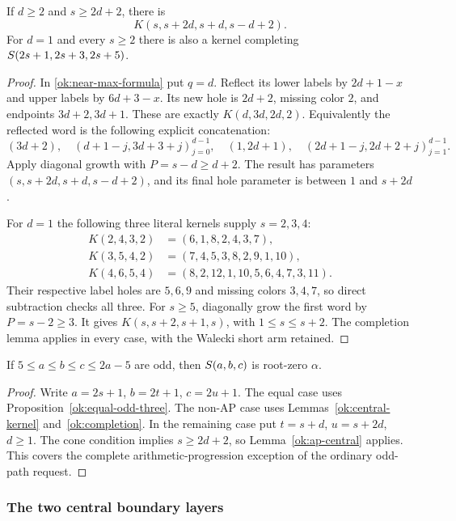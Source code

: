 \begin{lemma}\label{ok:ap-central}
If $d\ge2$ and $s\ge2d+2$, there is
\[
 K(s,s+2d,s+d,s-d+2).
 \]
For $d=1$ and every $s\ge2$ there is also a kernel completing
$S\!\left(2s+1,2s+3,2s+5\right)$.
\end{lemma}
\begin{proof}
In \eqref{ok:near-max-formula} put $q=d$. Reflect its lower
labels by $2d+1-x$ and upper labels by $6d+3-x$. Its new hole
is $2d+2$, missing color $2$, and endpoints $3d+2,3d+1$.
These are exactly $K(d,3d,2d,2)$. Equivalently the reflected word
is the following explicit concatenation:
\[
 (3d+2),\quad
 (d+1-j,3d+3+j)_{j=0}^{d-1},\quad
 (1,2d+1),\quad
 (2d+1-j,2d+2+j)_{j=1}^{d-1}.
 \]
Apply diagonal growth with $P=s-d\ge d+2$. The result has
parameters $(s,s+2d,s+d,s-d+2)$, and its final hole parameter
is between $1$ and $s+2d$.

For $d=1$ the following three literal kernels supply $s=2,3,4$:
\begin{align*}
 K(2,4,3,2)&=(6,1,8,2,4,3,7),\\
 K(3,5,4,2)&=(7,4,5,3,8,2,9,1,10),\\
 K(4,6,5,4)&=(8,2,12,1,10,5,6,4,7,3,11).
\end{align*}
Their respective label holes are $5,6,9$ and missing colors
$3,4,7$, so direct subtraction checks all three.
For $s\ge5$, diagonally grow the first word by $P=s-2\ge3$.
It gives $K(s,s+2,s+1,s)$, with $1\le s\le s+2$.
The completion lemma applies in every case, with the Walecki
short arm retained.
\end{proof}

\begin{corollary}\label{ok:interior-cone}
If $5\le a\le b\le c\le2a-5$ are odd, then
$S\!\left(a,b,c\right)$ is root-zero $\alpha$.
\end{corollary}
\begin{proof}
Write $a=2s+1$, $b=2t+1$, $c=2u+1$.
The equal case uses Proposition~\ref{ok:equal-odd-three}.
The non-AP case uses Lemmas~\ref{ok:central-kernel}
and~\ref{ok:completion}. In the remaining case put
$t=s+d$, $u=s+2d$, $d\ge1$.
The cone condition implies $s\ge2d+2$, so
Lemma~\ref{ok:ap-central} applies. This covers the complete
arithmetic-progression exception of the ordinary odd-path request.
\end{proof}

\subsubsection{The two central boundary layers}

